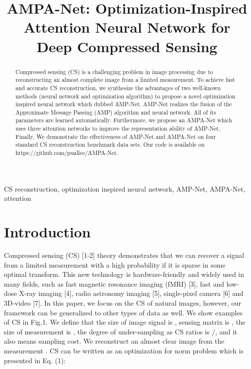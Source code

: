 \documentclass[conference]{IEEEtran}
\begin{document}
\title{AMPA-Net: Optimization-Inspired Attention Neural Network for Deep Compressed Sensing\\
}
\author{
\and
{}
}
\maketitle

\begin{abstract}
Compressed sensing (CS) is a challenging problem in image processing due to reconstructing an almost complete image from a limited measurement. To achieve fast and accurate CS reconstruction, we synthesize the advantages of two well-known methods (neural network and optimization algorithm) to propose a novel optimization inspired neural network which dubbed AMP-Net. AMP-Net realizes the fusion of the Approximate Message Passing (AMP) algorithm and neural network. All of its parameters are learned automatically. Furthermore, we propose an AMPA-Net which uses three attention networks to improve the representation ability of AMP-Net. Finally, We demonstrate the effectiveness of AMP-Net and AMPA-Net on four standard CS reconstruction benchmark data sets. Our code is available on https://github.com/puallee/AMPA-Net.
\end{abstract}
\begin{IEEEkeywords}
CS reconstruction, optimization inspired neural network, AMP-Net, AMPA-Net, attention
\end{IEEEkeywords}
\IEEEpeerreviewmaketitle
\section{Introduction}
Compressed sensing (CS) [1-2] theory demonstrates that we can recover a signal from a limited measurement with a high probability if it is sparse in some optimal transform. This new technology is hardware-friendly and widely used in many fields, such as fast magnetic resonance imaging (fMRI) [3], fast and low-dose X-ray imaging [4], radio astronomy imaging [5], single-pixel camera [6] and 3D-video [7]. In this paper, we focus on the CS of natural images, however, our framework can be generalized to other types of data as well.
We show examples of CS in Fig.1. We define that the size of image signal  is , sensing matrix is , the size of measurement  is , the degree of under-sampling as CS ratios is /, and it also means sampling cost. We reconstruct an almost clear image from the measurement . CS can be written as an optimization for  norm problem which is presented in Eq. (1):
 
\end{document}
